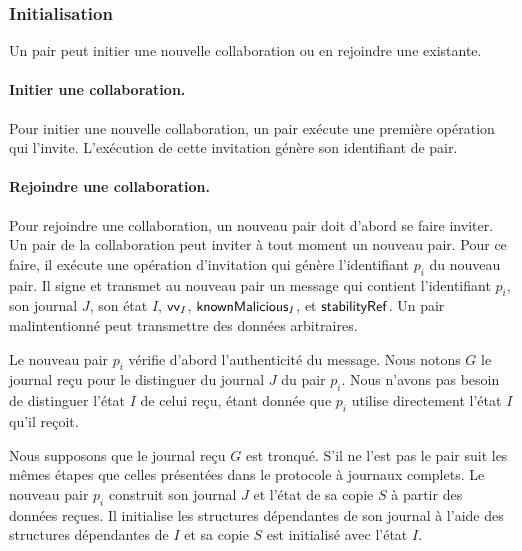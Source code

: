 \subsubsection{Initialisation}

Un pair peut initier une nouvelle collaboration ou en rejoindre une existante.

\paragraph{Initier une collaboration.}
Pour initier une nouvelle collaboration, un pair exécute une première opération qui l'invite. L'exécution de cette invitation génère son identifiant de pair.

\paragraph{Rejoindre une collaboration.}
Pour rejoindre une collaboration, un nouveau pair doit d'abord se faire inviter.
Un pair de la collaboration peut inviter à tout moment un nouveau pair.
Pour ce faire, il exécute une opération d'invitation qui génère l'identifiant $p_i$ du nouveau pair.
Il signe et transmet au nouveau pair un message qui contient l'identifiant $p_i$, son journal $J$, son état $I$, $\operatorname{\mathsf{vv}}_I$, $\operatorname{\mathsf{knownMalicious}}_I$, et $\operatorname{\mathsf{stabilityRef}}$.
Un pair malintentionné peut transmettre des données arbitraires.

Le nouveau pair $p_i$ vérifie d'abord l'authenticité du message.
Nous notons $G$ le journal reçu pour le distinguer du journal $J$ du pair $p_i$.
Nous n'avons pas besoin de distinguer l'état $I$ de celui reçu, étant donnée que $p_i$ utilise directement l'état $I$ qu'il reçoit.

Nous supposons que le journal reçu $G$ est tronqué.
S'il ne l'est pas le pair suit les mêmes étapes que celles présentées dans le protocole à journaux complets.
Le nouveau pair $p_i$ construit son journal $J$ et l'état de sa copie $S$ à partir des données reçues.
Il initialise les structures dépendantes de son journal à l'aide des structures dépendantes de $I$ et sa copie $S$ est initialisé avec l'état $I$.

\clearpage

